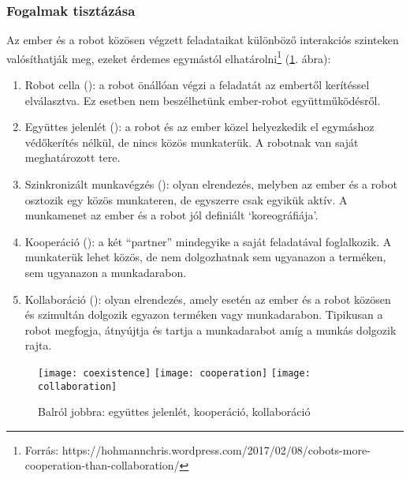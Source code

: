 \documentclass[../documentation.tex]{subfiles}
\begin{document}
\subsubsection{Fogalmak tisztázása}
Az ember és a robot közösen végzett feladataikat különböző interakciós szinteken valósíthatják meg, ezeket érdemes egymástól elhatárolni\footnote{Forrás: https://hohmannchris.wordpress.com/2017/02/08/cobots-more-cooperation-than-collaboration/} (\ref{fig:coex-coop-collab}. ábra):
\begin{enumerate}
	\item Robot cella (): a robot önállóan végzi a feladatát az embertől kerítéssel elválasztva. Ez esetben nem beszélhetünk ember-robot együttműködésről.
	\item Együttes jelenlét (): a robot és az ember közel helyezkedik el egymáshoz védőkerítés nélkül, de nincs közös munkaterük. A robotnak van saját meghatározott tere.
	\item Szinkronizált munkavégzés (): olyan elrendezés, melyben az ember és a robot osztozik egy közös munkateren, de egyszerre csak egyikük aktív. A munkamenet az ember és a robot jól definiált `koreográfiája'.
	\item Kooperáció (): a két ``partner'' mindegyike a saját feladatával foglalkozik. A munkaterük lehet közös, de nem dolgozhatnak sem ugyanazon a terméken, sem ugyanazon a munkadarabon.
	\item Kollaboráció (): olyan elrendezés, amely esetén az ember és a robot közösen és szimultán dolgozik egyazon terméken vagy munkadarabon. Tipikusan a robot megfogja, átnyújtja és tartja a munkadarabot amíg a munkás dolgozik rajta.
\end{enumerate}

\begin{figure}[h]
	\centering
	\texttt{[image: coexistence]}
	\texttt{[image: cooperation]}
	\texttt{[image: collaboration]}
	\caption[Caption for LOF]{Balról jobbra: együttes jelenlét, kooperáció, kollaboráció\footnotemark}
	\label{fig:coex-coop-collab}
\end{figure}

\end{document}
